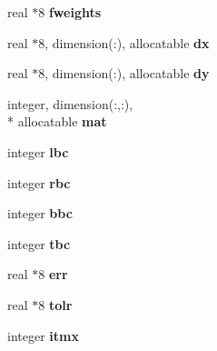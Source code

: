 \begin{DoxyCompactItemize}
\item 
\hypertarget{classinvar_a62caa28ee6cfc9246b29b2808567c112}{real $\ast$8 {\bfseries fweights}}\label{classinvar_a62caa28ee6cfc9246b29b2808567c112}

\item 
\hypertarget{classinvar_a6a89c71e56cbf68a304660d99b2d117b}{real $\ast$8, dimension(\+:), allocatable {\bfseries dx}}\label{classinvar_a6a89c71e56cbf68a304660d99b2d117b}

\item 
\hypertarget{classinvar_a204fdf570d734f509f2b291a5c118caa}{real $\ast$8, dimension(\+:), allocatable {\bfseries dy}}\label{classinvar_a204fdf570d734f509f2b291a5c118caa}

\item 
\hypertarget{classinvar_a7e75fa0b8c783ceaba90fec5c8e4c98b}{integer, dimension(\+:,\+:), \\*
allocatable {\bfseries mat}}\label{classinvar_a7e75fa0b8c783ceaba90fec5c8e4c98b}

\item 
\hypertarget{classinvar_a7852edfcc890a0c2ee575128cfded680}{integer {\bfseries lbc}}\label{classinvar_a7852edfcc890a0c2ee575128cfded680}

\item 
\hypertarget{classinvar_a861dae72d9d2fcd9ea116e650207ec18}{integer {\bfseries rbc}}\label{classinvar_a861dae72d9d2fcd9ea116e650207ec18}

\item 
\hypertarget{classinvar_a6d111f3f294d097892bd94714ac2de9b}{integer {\bfseries bbc}}\label{classinvar_a6d111f3f294d097892bd94714ac2de9b}

\item 
\hypertarget{classinvar_a0ccc322d850fbe1074cb937cde449e02}{integer {\bfseries tbc}}\label{classinvar_a0ccc322d850fbe1074cb937cde449e02}

\item 
\hypertarget{classinvar_ab909446efeb5bdca23d80d75c93731da}{real $\ast$8 {\bfseries err}}\label{classinvar_ab909446efeb5bdca23d80d75c93731da}

\item 
\hypertarget{classinvar_ab259d9aba004a4dc3064942297f86839}{real $\ast$8 {\bfseries tolr}}\label{classinvar_ab259d9aba004a4dc3064942297f86839}

\item 
\hypertarget{classinvar_aca04f7cbe921bb249c576680adbd0fd8}{integer {\bfseries itmx}}\label{classinvar_aca04f7cbe921bb249c576680adbd0fd8}


\end{DoxyCompactItemize}
